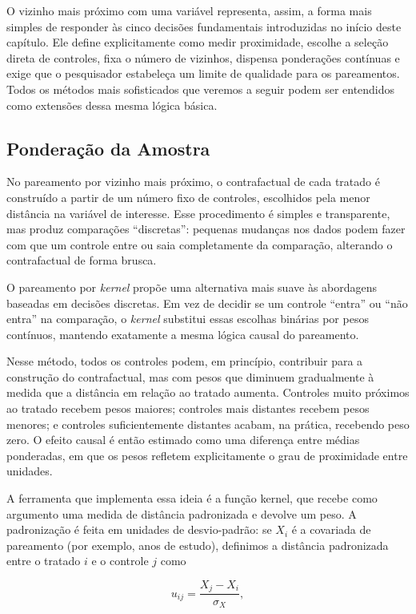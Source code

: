 O vizinho mais próximo com uma variável representa, assim, a forma mais simples de responder às cinco decisões fundamentais introduzidas no início deste capítulo. Ele define explicitamente como medir proximidade, escolhe a seleção direta de controles, fixa o número de vizinhos, dispensa ponderações contínuas e exige que o pesquisador estabeleça um limite de qualidade para os pareamentos. Todos os métodos mais sofisticados que veremos a seguir podem ser entendidos como extensões dessa mesma lógica básica.

\subsection{Ponderação da Amostra}

No pareamento por vizinho mais próximo, o contrafactual de cada tratado é construído a partir de um número fixo de controles, escolhidos pela menor distância na variável de interesse. Esse procedimento é simples e transparente, mas produz comparações “discretas”: pequenas mudanças nos dados podem fazer com que um controle entre ou saia completamente da comparação, alterando o contrafactual de forma brusca.

O pareamento por \textit{kernel} propõe uma alternativa mais suave às abordagens baseadas em decisões discretas. Em vez de decidir se um controle ``entra'' ou ``não entra'' na comparação, o \textit{kernel} substitui essas escolhas binárias por pesos contínuos, mantendo exatamente a mesma lógica causal do pareamento.

Nesse método, todos os controles podem, em princípio, contribuir para a construção do contrafactual, mas com pesos que diminuem gradualmente à medida que a distância em relação ao tratado aumenta. Controles muito próximos ao tratado recebem pesos maiores; controles mais distantes recebem pesos menores; e controles suficientemente distantes acabam, na prática, recebendo peso zero. O efeito causal é então estimado como uma diferença entre médias ponderadas, em que os pesos refletem explicitamente o grau de proximidade entre unidades.


A ferramenta que implementa essa ideia é a função kernel, que recebe como argumento uma medida de distância padronizada e devolve um peso. A padronização é feita em unidades de desvio-padrão: se $X_i$ é a covariada de pareamento (por exemplo, anos de estudo), definimos a distância padronizada entre o tratado $i$ e o controle $j$ como

$$
u_{ij} = \frac{X_j - X_i}{\sigma_X},
$$

